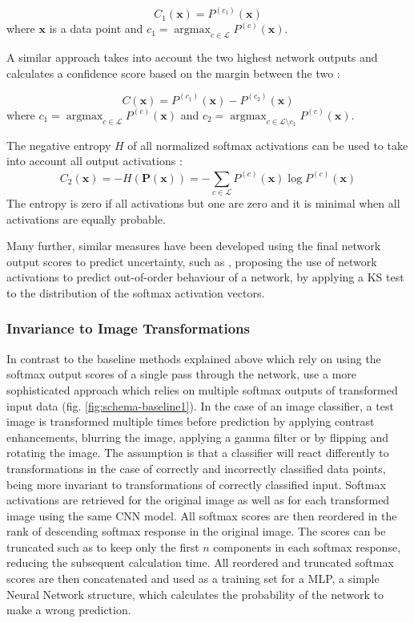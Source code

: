 \documentclass[10pt]{article}
\DeclareMathOperator{\argmax}{argmax}
\begin{document}
\begin{equation}
	\label{eq:net_msr}
    C_1(\mathbf{x})=P^{(c_1)}(\mathbf{x})
\end{equation}
where $\mathbf{x}$ is a data point and $c_1=\argmax_{c\in\mathcal{L}}P^{(c)}(\mathbf{x})$.

A similar approach takes into account the two highest network outputs and calculates a confidence score based on the margin between the two \cite{ouerghemmi_two-step_2017, mandelbaum17}:

\begin{equation}
	\label{eq:net_margin}
    C(\mathbf{x})=P^{(c_1)}(\mathbf{x})-P^{(c_2)}(\mathbf{x})
\end{equation}
where $c_1=\argmax_{c\in\mathcal{L}}P^{(c)}(\mathbf{x})$ and $c_2=\argmax_{c\in\mathcal{L}\setminus c_1}P^{(c)}(\mathbf{x})$.

The negative entropy $H$ of all normalized softmax activations can be used to take into account all output activations \cite{zaragoza}:
\begin{equation}
    \label{eq:net_entropy}
    C_2(\mathbf{x}) = -H(\mathbf{P(\mathbf{x})}) = -\sum_{c\in \mathcal{L}}^{}P^{(c)}(\mathbf{x})\log P^{(c)}(\mathbf{x})
\end{equation}
The entropy is zero if all activations but one are zero and it is minimal when all activations are equally probable.

Many further, similar measures have been developed using the final network output scores to predict uncertainty, such as \textcite{Sun2018KSconfA}, proposing the use of network activations to predict out-of-order behaviour of a network, by applying a \gls{KS} test to the distribution of the softmax activation vectors.

\subsubsection{Invariance to Image Transformations}
In contrast to the baseline methods explained above which rely on using the softmax output scores of a single pass through the network, \textcite{Bahat_2018} use a more sophisticated approach which relies on multiple softmax outputs of transformed input data (fig. \ref{fig:schema-baseline1}). In the case of an image classifier, a test image is transformed multiple times before prediction by applying contrast enhancements, blurring the image, applying a gamma filter or by flipping and rotating the image. The assumption is that a classifier will react differently to transformations in the case of correctly and incorrectly classified data points, being more invariant to transformations of correctly classified input. Softmax activations are retrieved for the original image as well as for each transformed image using the same \gls{CNN} model. All softmax scores are then reordered in the rank of descending softmax response in the original image. The scores can be truncated such as to keep only the first $n$ components in each softmax response, reducing the subsequent calculation time. All reordered and truncated softmax scores are then concatenated and used as a training set for a \gls{MLP}, a simple Neural Network structure, which calculates the probability of the network to make a wrong prediction.
\end{document}
